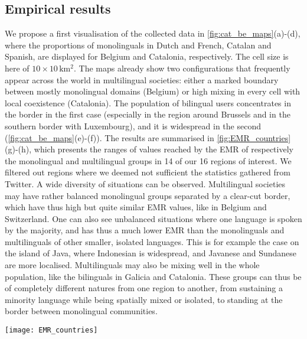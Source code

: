 \documentclass[../thesis.tex]{subfiles}
\begin{document}
\subsection{Empirical results}
We propose a first visualisation of the collected data in \cref{fig:cat_be_maps}(a)-(d),
where the proportions of monolinguals in Dutch and French, Catalan and Spanish, are
displayed for Belgium and Catalonia, respectively. The cell size is here of $10 \times
10 \, \si{\kilo \meter \squared}$. The maps already show two configurations that
frequently appear across the world in multilingual societies: either a marked boundary
between mostly monolingual domains (Belgium) or high mixing in every cell with local
coexistence (Catalonia). The population of bilingual users concentrates in the border in
the first case (especially in the region around Brussels and in the southern border with
Luxembourg), and it is widespread in the second (\cref{fig:cat_be_maps}(e)-(f)). The
results are summarised in \cref{fig:EMR_countries}(g)-(h), which presents the ranges of
values reached by the \ac{EMR} of respectively the monolingual and multilingual groups
in 14 of our 16 regions of interest. We filtered out regions where we deemed not
sufficient the statistics gathered from Twitter. A wide diversity of situations can be
observed. Multilingual societies may have rather balanced monolingual groups separated
by a clear-cut border, which have thus high but quite similar \ac{EMR} values, like in
Belgium and Switzerland. One can also see unbalanced situations where one language is
spoken by the majority, and has thus a much lower \ac{EMR} than the monolinguals and
multilinguals of other smaller, isolated languages. This is for example the case on the
island of Java, where Indonesian is widespread, and Javanese and Sundanese are more
localised. Multilinguals may also be mixing well in the whole population, like the
bilinguals in Galicia and Catalonia. These groups can thus be of completely different
natures from one region to another, from sustaining a minority language while being
spatially mixed or isolated, to standing at the border between monolingual communities.

\begin{figure*}[h!]
  \centering
  \texttt{[image: EMR\_countries]}
  \caption{\acp{EMR} of the (a) monolingual and (b) multilingual groups of
  multilingual regions of interest, ranked left to right by increasing average of the
  $y$-axis values. In (b), the point for trilinguals in Switzerland is not displayed
  because its value was deemed unreliable. A rich diversity of mixing patterns is
  shown, beyond the two paradigmatic cases of Catalonia and Belgium.}
  \label{fig:EMR_countries}
\end{figure*}
\end{document}
